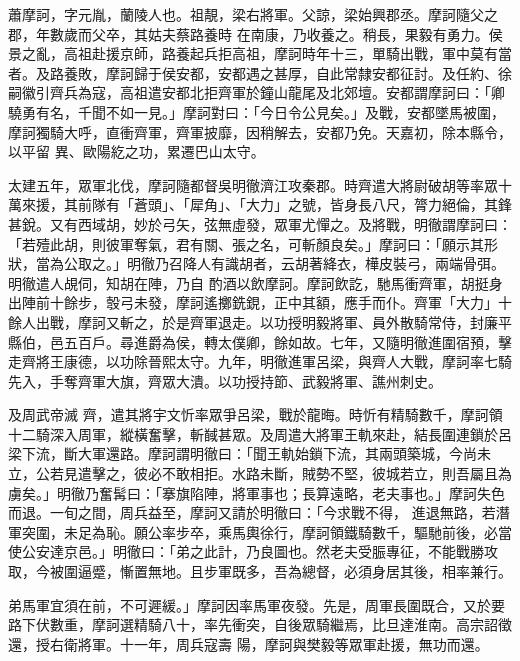
\begin{pinyinscope}

 蕭摩訶，字元胤，蘭陵人也。祖靚，梁右將軍。父諒，梁始興郡丞。摩訶隨父之郡，年數歲而父卒，其姑夫蔡路養時
 在南康，乃收養之。稍長，果毅有勇力。侯景之亂，高祖赴援京師，路養起兵拒高祖，摩訶時年十三，單騎出戰，軍中莫有當者。及路養敗，摩訶歸于侯安都，安都遇之甚厚，自此常隸安都征討。及任約、徐嗣徽引齊兵為寇，高祖遣安都北拒齊軍於鐘山龍尾及北郊壇。安都謂摩訶曰：「卿驍勇有名，千聞不如一見。」摩訶對曰：「今日令公見矣。」及戰，安都墜馬被圍，摩訶獨騎大呼，直衝齊軍，齊軍披靡，因稍解去，安都乃免。天嘉初，除本縣令，以平留
 異、歐陽紇之功，累遷巴山太守。



 太建五年，眾軍北伐，摩訶隨都督吳明徹濟江攻秦郡。時齊遣大將尉破胡等率眾十萬來援，其前隊有「蒼頭」、「犀角」、「大力」之號，皆身長八尺，膂力絕倫，其鋒甚銳。又有西域胡，妙於弓矢，弦無虛發，眾軍尤憚之。及將戰，明徹謂摩訶曰：「若殪此胡，則彼軍奪氣，君有關、張之名，可斬顏良矣。」摩訶曰：「願示其形狀，當為公取之。」明徹乃召降人有識胡者，云胡著絳衣，樺皮裝弓，兩端骨弭。明徹遣人覘伺，知胡在陣，乃自
 酌酒以飲摩訶。摩訶飲訖，馳馬衝齊軍，胡挺身出陣前十餘步，彀弓未發，摩訶遙擲銑鋧，正中其額，應手而仆。齊軍「大力」十餘人出戰，摩訶又斬之，於是齊軍退走。以功授明毅將軍、員外散騎常侍，封廉平縣伯，邑五百戶。尋進爵為侯，轉太僕卿，餘如故。七年，又隨明徹進圍宿預，擊走齊將王康德，以功除晉熙太守。九年，明徹進軍呂梁，與齊人大戰，摩訶率七騎先入，手奪齊軍大旗，齊眾大潰。以功授持節、武毅將軍、譙州刺史。



 及周武帝滅
 齊，遣其將宇文忻率眾爭呂梁，戰於龍晦。時忻有精騎數千，摩訶領十二騎深入周軍，縱橫奮擊，斬馘甚眾。及周遣大將軍王軌來赴，結長圍連鎖於呂梁下流，斷大軍還路。摩訶謂明徹曰：「聞王軌始鎖下流，其兩頭築城，今尚未立，公若見遣擊之，彼必不敢相拒。水路未斷，賊勢不堅，彼城若立，則吾屬且為虜矣。」明徹乃奮髯曰：「搴旗陷陣，將軍事也；長算遠略，老夫事也。」摩訶失色而退。一旬之間，周兵益至，摩訶又請於明徹曰：「今求戰不得，
 進退無路，若潛軍突圍，未足為恥。願公率步卒，乘馬輿徐行，摩訶領鐵騎數千，驅馳前後，必當使公安達京邑。」明徹曰：「弟之此計，乃良圖也。然老夫受脤專征，不能戰勝攻取，今被圍逼蹙，慚置無地。且步軍既多，吾為總督，必須身居其後，相率兼行。



 弟馬軍宜須在前，不可遲緩。」摩訶因率馬軍夜發。先是，周軍長圍既合，又於要路下伏數重，摩訶選精騎八十，率先衝突，自後眾騎繼焉，比旦達淮南。高宗詔徵還，授右衛將軍。十一年，周兵寇壽
 陽，摩訶與樊毅等眾軍赴援，無功而還。




\end{pinyinscope}

